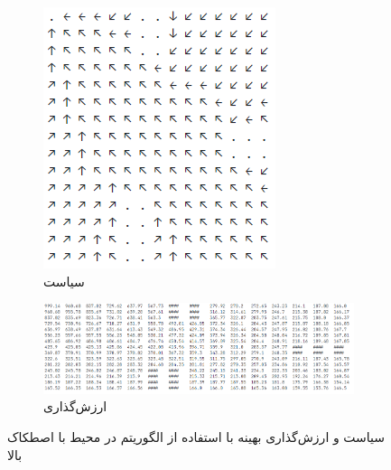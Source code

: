 \documentclass[12pt, a4paper]{article}
\begin{document}
\begin{figure}
    \begin{subfigure}{\linewidth}
        \centering
        \includegraphics{images/q4/e/highcost/policy.png}
        \caption{سیاست}
    \end{subfigure}
    \newline
    \begin{subfigure}{\linewidth}
        \centering
        \includegraphics[width=\linewidth]{images/q4/e/highcost/value.png}
        \caption{ارزش‌گذاری}
    \end{subfigure}
    \caption{سیاست و ارزش‌گذاری بهینه با استفاده از الگوریتم  در محیط با اصطکاک بالا}
    \label{value_iter_highcost}
\end{figure}
\end{document}
